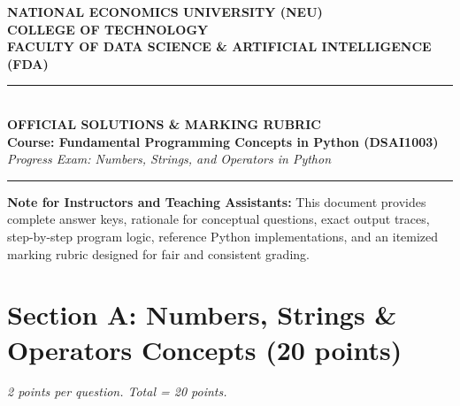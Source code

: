 \documentclass[11pt,a4paper]{article}
\begin{document}
\begin{center}
  {\Large\textbf{NATIONAL ECONOMICS UNIVERSITY (NEU)}}\\[0.15cm]
  {\large\textbf{COLLEGE OF TECHNOLOGY}}\\[0.10cm]
  {\large\textbf{FACULTY OF DATA SCIENCE \& ARTIFICIAL INTELLIGENCE (FDA)}}\\[0.25cm]
  \rule{\textwidth}{1.2pt}\\[0.3cm]
  {\LARGE\bfseries\color{primaryblue}OFFICIAL SOLUTIONS \& MARKING RUBRIC}\\[0.15cm]
  {\large\textbf{Course: Fundamental Programming Concepts in Python (DSAI1003)}}\\[0.15cm]
  {\normalsize\textit{Progress Exam: Numbers, Strings, and Operators in Python}}\\[0.2cm]
  \rule{\textwidth}{0.6pt}
\end{center}

\vspace{0.2cm}

\begin{tcolorbox}[colback=green!8, colframe=correctgreen, arc=1.5mm]
\small
\textbf{Note for Instructors and Teaching Assistants:}
This document provides complete answer keys, rationale for conceptual questions, exact output traces, step-by-step program logic, reference Python implementations, and an itemized marking rubric designed for fair and consistent grading.
\end{tcolorbox}

\vspace{0.2cm}

\section*{Section A: Numbers, Strings \& Operators Concepts (20 points)}
\textit{2 points per question. Total = 20 points.}
\end{document}
